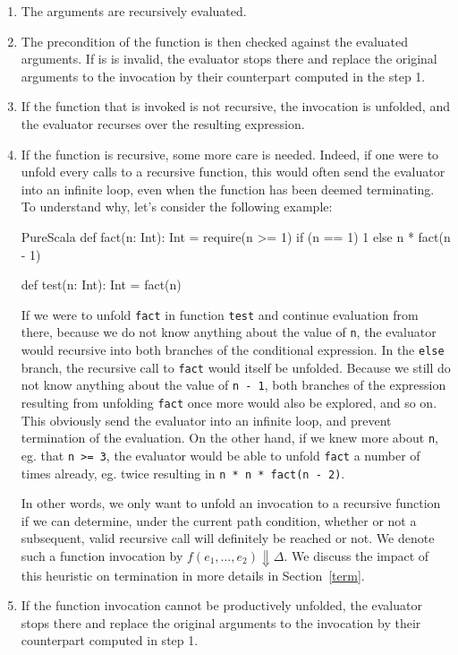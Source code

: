 \documentclass[a4paper,twoside]{article}
\newcommand{\InlineS}[1]{\lstinline[language=PureScala,basicstyle=\small\ttfamily,columns=fixed]|#1|}
\newcommand{\RefSec}[1]{Section~\ref{#1}}
\newcommand{\RefFig}[1]{Figure~\ref{#1}}
\newcommand{\stt}[1]{\texttt{\small{#1}}}
\begin{document}
\begin{enumerate}
\item The arguments are recursively evaluated.
\item The precondition of the function is then checked against the evaluated arguments. If is is invalid, the evaluator stops there and replace the original arguments to the invocation by their counterpart computed in the step 1.
\item If the function that is invoked is not recursive, the invocation is unfolded, and the evaluator recurses over the resulting expression.
\item If the function is recursive, some more care is needed. Indeed, if one were to unfold every calls to a recursive function, this would often send the evaluator into an infinite loop, even when the function has been deemed terminating. To understand why, let's consider the following example:

\begin{ShortCode}{PureScala}
def fact(n: Int): Int = {
  require(n >= 1)
  if (n == 1) 1 else n * fact(n - 1)
}

def test(n: Int): Int = fact(n)
\end{ShortCode}

If we were to unfold \stt{fact} in function \stt{test} and continue evaluation from there, because we do not know anything about the value of \stt{n}, the evaluator would recursive into both branches of the conditional expression. In the \InlineS{else} branch, the recursive call to \stt{fact} would itself be unfolded. Because we still do not know anything about the value of \stt{n - 1}, both branches of the expression resulting from unfolding \stt{fact} once more would also be explored, and so on. This obviously send the evaluator into an infinite loop, and prevent termination of the evaluation. On the other hand, if we knew more about \stt{n}, eg. that \stt{n >= 3}, the evaluator would be able to unfold \stt{fact} a number of times already, eg. twice resulting in \stt{n * n * fact(n - 2)}.

In other words, we only want to unfold an invocation to a recursive function if we can  determine, under the current path condition, whether or not a subsequent, valid recursive call will definitely be reached or not. We denote such a function invocation by $f(e_1, \ldots, e_2) \Downarrow \Delta$. We discuss the impact of this heuristic on termination in more details in \RefSec{term}.


\item If the function invocation cannot be productively unfolded, the evaluator stops there and replace the original arguments to the invocation by their counterpart computed in step 1.
\end{enumerate}
\end{document}
